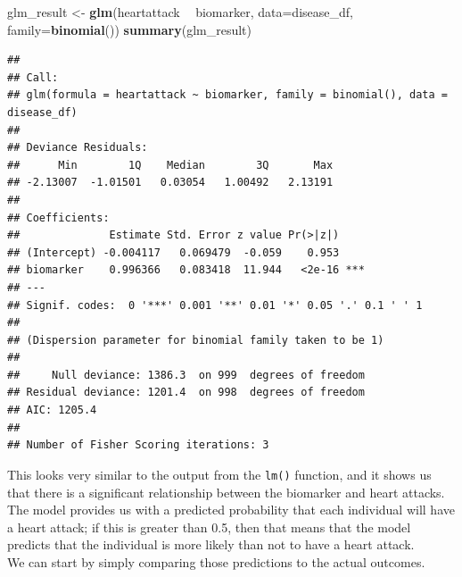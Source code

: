\documentclass[12pt,]{book}
\newenvironment{Shaded}{\begin{snugshade}}{\end{snugshade}}
\newcommand{\CommentTok}[1]{\textcolor[rgb]{0.56,0.35,0.01}{\textit{#1}}}
\newcommand{\DataTypeTok}[1]{\textcolor[rgb]{0.13,0.29,0.53}{#1}}
\newcommand{\FloatTok}[1]{\textcolor[rgb]{0.00,0.00,0.81}{#1}}
\newcommand{\KeywordTok}[1]{\textcolor[rgb]{0.13,0.29,0.53}{\textbf{#1}}}
\newcommand{\NormalTok}[1]{#1}
\newcommand{\OperatorTok}[1]{\textcolor[rgb]{0.81,0.36,0.00}{\textbf{#1}}}
\newcommand{\OtherTok}[1]{\textcolor[rgb]{0.56,0.35,0.01}{#1}}
\newcommand{\StringTok}[1]{\textcolor[rgb]{0.31,0.60,0.02}{#1}}
\begin{document}
\begin{Shaded}
\begin{Highlighting}[]
\NormalTok{glm_result <-}\StringTok{ }\KeywordTok{glm}\NormalTok{(heartattack }\OperatorTok{~}\StringTok{ }\NormalTok{biomarker, }\DataTypeTok{data=}\NormalTok{disease_df,}
                  \DataTypeTok{family=}\KeywordTok{binomial}\NormalTok{())}
\KeywordTok{summary}\NormalTok{(glm_result)}
\end{Highlighting}
\end{Shaded}

\begin{verbatim}
## 
## Call:
## glm(formula = heartattack ~ biomarker, family = binomial(), data = disease_df)
## 
## Deviance Residuals: 
##      Min        1Q    Median        3Q       Max  
## -2.13007  -1.01501   0.03054   1.00492   2.13191  
## 
## Coefficients:
##              Estimate Std. Error z value Pr(>|z|)    
## (Intercept) -0.004117   0.069479  -0.059    0.953    
## biomarker    0.996366   0.083418  11.944   <2e-16 ***
## ---
## Signif. codes:  0 '***' 0.001 '**' 0.01 '*' 0.05 '.' 0.1 ' ' 1
## 
## (Dispersion parameter for binomial family taken to be 1)
## 
##     Null deviance: 1386.3  on 999  degrees of freedom
## Residual deviance: 1201.4  on 998  degrees of freedom
## AIC: 1205.4
## 
## Number of Fisher Scoring iterations: 3
\end{verbatim}

This looks very similar to the output from the \texttt{lm()} function, and it shows us that there is a significant relationship between the biomarker and heart attacks. The model provides us with a predicted probability that each individual will have a heart attack; if this is greater than 0.5, then that means that the model predicts that the individual is more likely than not to have a heart attack.\\
We can start by simply comparing those predictions to the actual outcomes.

\begin{Shaded}
\end{Shaded}
\end{document}
